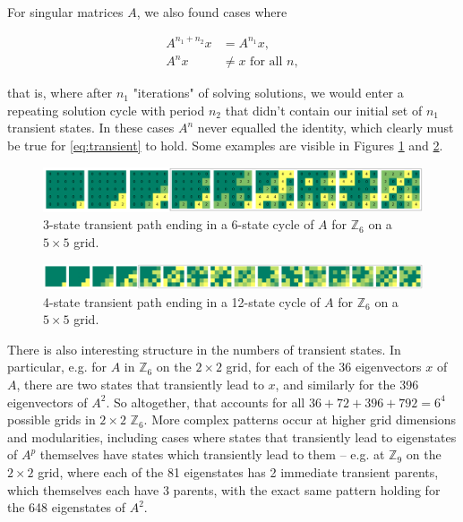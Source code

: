 \documentclass[11pt]{article}
\newcommand{\modZ}[1]{$\mathbb{Z}_{#1}$}
\begin{document}

\paragraph{} For singular matrices $A$, we also found cases where

\begin{equation}
\begin{split}
  A^{n_1 + n_2}x & = A^{n_1}x,\\
  A^{n}x & \neq x \text{ for all } n,
\end{split}
\label{eq:transient}
\end{equation}

\noindent that is, where after $n_1$ "iterations" of solving solutions, we would enter a repeating solution cycle with period $n_2$ that didn't contain our initial set of $n_1$ transient states. In these cases $A^n$ never equalled the identity, which clearly must be true for \eqref{eq:transient} to hold. Some examples are visible in Figures \ref{655-transient} and \ref{655-transient-long}.

\begin{figure}[H]
  \caption{3-state transient path ending in a 6-state cycle of $A$ for \modZ{6} on a $5 \times 5$ grid.}
  \label{655-transient}
  \includegraphics[width=\textwidth]{655-transient.png}
\end{figure}

\begin{figure}[H]
  \caption{4-state transient path ending in a 12-state cycle of $A$ for \modZ{6} on a $5 \times 5$ grid.}
  \label{655-transient-long}
  \includegraphics[width=\textwidth]{655-transient-long.png}
\end{figure}

There is also interesting structure in the numbers of transient states. In particular, e.g. for $A$ in \modZ{6} on the $2 \times 2$ grid, for each of the 36 eigenvectors $x$ of $A$, there are two states that transiently lead to $x$, and similarly for the 396 eigenvectors of $A^2$. So altogether, that accounts for all $36+72+396+792=6^4$ possible grids in $2 \times 2$ \modZ{6}. More complex patterns occur at higher grid dimensions and modularities, including cases where states that transiently lead to eigenstates of $A^p$ themselves have states which transiently lead to them -- e.g. at \modZ{9} on the $2 \times 2$ grid, where each of the 81 eigenstates has 2 immediate transient parents, which themselves each have 3 parents, with the exact same pattern holding for the 648 eigenstates of $A^2$.
\end{document}
